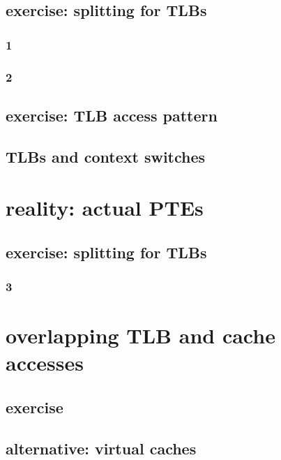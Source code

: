 \subsection{exercise: splitting for TLBs}
\subsubsection{1}

\subsubsection{2}



\subsection{exercise: TLB access pattern}




\subsection{TLBs and context switches}


\section{reality: actual PTEs}



\subsection{exercise: splitting for TLBs}
\subsubsection{3}


\section{overlapping TLB and cache accesses}


\subsection{exercise}


\subsection{alternative: virtual caches}



